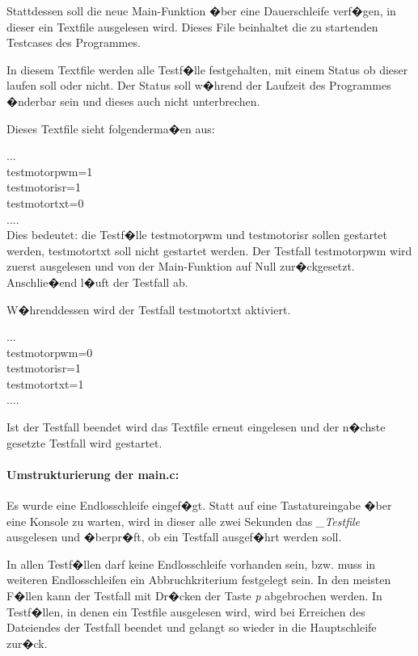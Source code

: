 Stattdessen soll die neue Main-Funktion �ber eine Dauerschleife verf�gen, in dieser ein Textfile ausgelesen wird. Dieses File beinhaltet die zu startenden Testcases des Programmes.

In diesem Textfile werden alle Testf�lle festgehalten, mit einem Status ob dieser laufen soll oder nicht. Der Status soll w�hrend der Laufzeit des Programmes �nderbar sein und dieses auch nicht unterbrechen.

Dieses Textfile sieht folgenderma�en aus:

...\\
testmotorpwm=1\\
testmotorisr=1\\
testmotortxt=0\\
....\\

Dies bedeutet: die Testf�lle testmotorpwm und testmotorisr sollen gestartet werden, testmotortxt soll nicht gestartet werden.
Der Testfall testmotorpwm wird zuerst ausgelesen und von der Main-Funktion auf Null zur�ckgesetzt. Anschlie�end l�uft der Testfall ab.

W�hrenddessen wird der Testfall testmotortxt aktiviert. 

...\\
testmotorpwm=0\\
testmotorisr=1\\
testmotortxt=1\\
....

Ist der Testfall beendet wird das Textfile erneut eingelesen und der n�chste gesetzte Testfall wird gestartet.

\newpage
\paragraph{Umstrukturierung der main.c:}

Es wurde eine Endlosschleife eingef�gt. Statt auf eine Tastatureingabe �ber eine Konsole zu warten, wird in dieser alle zwei Sekunden das \textit{\_Testfile} ausgelesen und �berpr�ft, ob ein Testfall ausgef�hrt werden soll.

In allen Testf�llen darf keine Endlosschleife vorhanden sein, bzw. muss in weiteren Endlosschleifen ein Abbruchkriterium festgelegt sein. In den meisten F�llen kann der Testfall mit Dr�cken der Taste \textit{p} abgebrochen werden. In Testf�llen, in denen ein Testfile ausgelesen wird, wird bei Erreichen des Dateiendes der Testfall beendet und gelangt so wieder in die Hauptschleife zur�ck.

